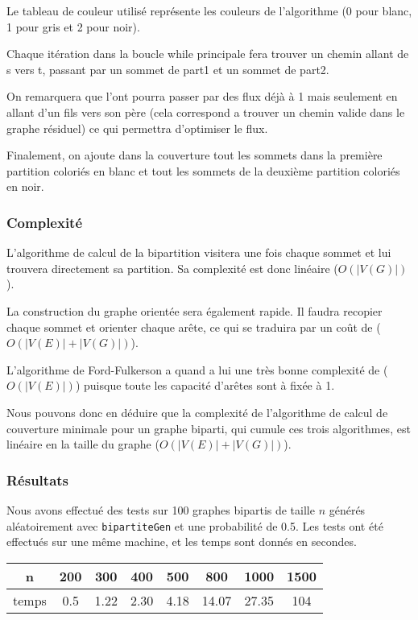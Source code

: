 \documentclass[a4paper,10pt]{article}
\begin{document}
Le tableau de couleur utilisé représente les couleurs de l'algorithme (0 pour blanc, 1 pour gris et 2 pour noir).

Chaque itération dans la boucle while principale fera trouver un chemin allant de s vers t, passant par un sommet de part1 et un sommet de part2.

On remarquera que l'ont pourra passer par des flux déjà à 1 mais seulement en allant d'un fils vers son père (cela correspond a trouver un chemin valide dans le graphe résiduel) ce qui permettra d'optimiser le flux.

Finalement, on ajoute dans la couverture tout les sommets dans la première partition coloriés en blanc et tout les sommets de la deuxième partition coloriés en noir.

\subsubsection{Complexité}

L'algorithme de calcul de la bipartition visitera une fois chaque sommet et lui trouvera directement sa partition. Sa complexité est donc linéaire ($O(|V(G)|)$).

La construction du graphe orientée sera également rapide. Il faudra recopier chaque sommet et orienter chaque arête, ce qui se traduira par un coût de ($O(|V(E)|+ |V(G)|)$).

L'algorithme de Ford-Fulkerson a quand a lui une très bonne complexité de ($O(|V(E)|)$) puisque toute les capacité d'arêtes sont à fixée à 1.

Nous pouvons donc en déduire que la complexité de l'algorithme de calcul de couverture minimale pour un graphe biparti, qui cumule ces trois algorithmes, est linéaire en la taille du graphe ($O(|V(E)|+ |V(G)|)$).

\subsubsection{Résultats}

Nous avons effectué des tests sur 100 graphes bipartis de taille $n$ générés aléatoirement avec \texttt{bipartiteGen} et une probabilité de 0.5. Les tests ont été effectués sur une même machine, et les temps sont donnés en secondes.

\begin{center}
\begin{tabular}{|c|c|c|c|c|c|c|c|}
	\hline 
	n & 200 & 300 & 400 & 500 & 800 & 1000 & 1500 \\
	\hline
	temps & 0.5 & 1.22 & 2.30 & 4.18 & 14.07 & 27.35 & 104 \\
	\hline
\end{tabular}
\end{center}
\end{document}
